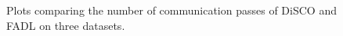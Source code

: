 \documentclass[twoside, 11pt]{article}
\begin{document}
\begin{figure}[H]

\caption{Plots comparing the number of communication passes of DiSCO and FADL on three datasets.}
\label{fig:commpassD1}
\end{figure}
\end{document}
